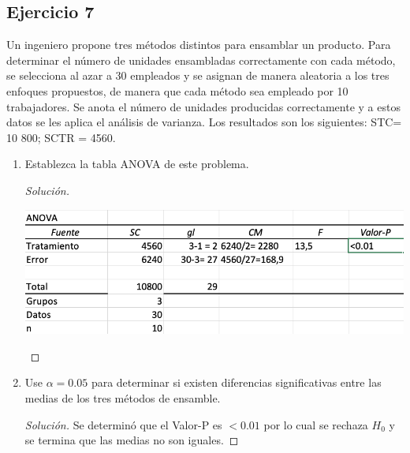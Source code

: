 \documentclass[a4paper,12pt]{article}
\newenvironment{solution}
  {\renewcommand\qedsymbol{$\blacksquare$}\begin{proof}[Solución]}
  {\end{proof}}
\begin{document}
\subsection{Ejercicio 7}
 Un ingeniero propone tres métodos distintos para ensamblar un producto. Para determinar el número de unidades ensambladas correctamente con cada método, se selecciona al azar a 30 empleados y se asignan de manera aleatoria a los tres enfoques propuestos, de manera que cada método sea empleado por 10 trabajadores. Se anota el número de unidades producidas correctamente y a estos datos se les aplica el análisis de varianza. Los resultados son los siguientes: STC= 10 800; SCTR = 4560.
 
 \begin{enumerate}
     \item Establezca la tabla ANOVA de este problema.
     \begin{solution}
     \begin{center}
         \includegraphics[scale=.5]{Imagenes/3.png}
     \end{center}
     \end{solution}
     \item  Use $\alpha =0.05$ para determinar si existen diferencias significativas entre las medias de los tres métodos de ensamble.
     \begin{solution}
     Se determinó que el Valor-P es $<0.01$ por lo cual se rechaza $H_0$ y se termina que las medias no son iguales.
     \end{solution}
 \end{enumerate}
\end{document}
